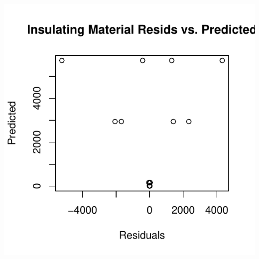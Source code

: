 \documentclass{article}\usepackage[]{graphicx}\usepackage[]{color}
\makeatletter
\def\maxwidth{ %
  \ifdim\Gin@nat@width>\linewidth
    \linewidth
  \else
    \Gin@nat@width
  \fi
}
\newenvironment{knitrout}{}{} %
\makeatother
\begin{document}
\begin{enumerate}
\begin{enumerate}
\begin{knitrout}
\color{fgcolor}
\includegraphics[width=\maxwidth]{figure/prob1d-1} 

\end{knitrout}


\end{enumerate}
\end{enumerate}
\end{document}
